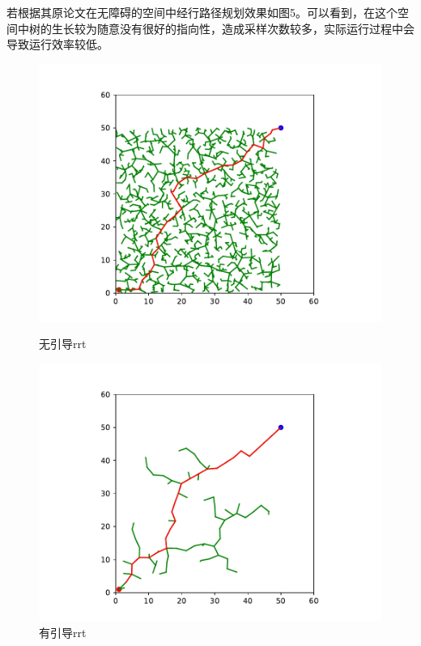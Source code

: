 \documentclass[12pt]{article}
\begin{document}
    若根据其原论文在无障碍的空间中经行路径规划效果如图5。可以看到，在这个空间中树的生长较为随意没有很好的指向性，造成采样次数较多，实际运行过程中会导致运行效率较低。
    \begin{figure}[H]
        \centering
        \begin{minipage}[t]{0.45\linewidth}
            \includegraphics[scale=0.4]{fig/rrt_no_obs.pdf}
            \caption{无引导rrt}
        \end{minipage}
        \begin{minipage}[t]{0.45\linewidth}
            \includegraphics[scale=0.4]{fig/rrt_guide.pdf}
            \caption{有引导rrt}
        \end{minipage}
    \end{figure}
\end{document}
